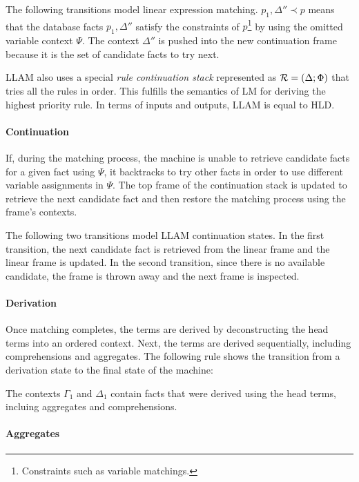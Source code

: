 The following transitions model linear expression matching. $p_1, \Delta'' \prec
p$ means that the database facts $p_1, \Delta''$ satisfy the constraints of
$p$\footnote{Constraints such as variable matchings.} by using the omitted
variable context $\Psi$. The context $\Delta''$ is pushed into the new
continuation frame because it is the set of candidate facts to try next.



LLAM also uses a special \emph{rule continuation stack} represented as $\mathcal{R}
= (\Delta; \Phi)$ that tries all the rules in order. This fulfills the semantics
of LM for deriving the highest priority rule. In terms of inputs and outputs,
LLAM is equal to HLD.

\paragraph{Continuation} If, during the matching process, the machine is unable
to retrieve candidate facts for a given fact using $\Psi$, it backtracks to try
other facts in order to use different variable assignments in $\Psi$. The top
frame of the continuation stack is updated to retrieve the next candidate fact
and then restore the matching process using the frame's contexts.

The following two transitions model LLAM continuation states. In the first
transition, the next candidate fact is retrieved from the linear frame and the
linear frame is updated. In the second transition, since there is no available
candidate, the frame is thrown away and the next frame is inspected.



\paragraph{Derivation}

Once matching completes, the terms are derived by deconstructing the head terms
into an ordered context. Next, the terms are derived sequentially, including
comprehensions and aggregates. The following rule shows the transition from a
derivation state to the final state of the machine:



The contexts $\Gamma_1$ and $\Delta_1$ contain facts that were derived using the
head terms, incluing aggregates and comprehensions.

\paragraph{Aggregates}

